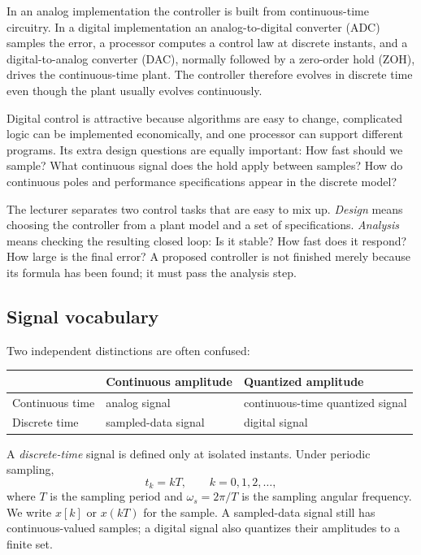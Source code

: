 \documentclass[11pt]{article}
\begin{document}
In an analog implementation the controller is built from continuous-time circuitry. In a digital implementation an analog-to-digital converter (ADC) samples the error, a processor computes a control law at discrete instants, and a digital-to-analog converter (DAC), normally followed by a zero-order hold (ZOH), drives the continuous-time plant. The controller therefore evolves in discrete time even though the plant usually evolves continuously.

Digital control is attractive because algorithms are easy to change, complicated logic can be implemented economically, and one processor can support different programs. Its extra design questions are equally important: How fast should we sample? What continuous signal does the hold apply between samples? How do continuous poles and performance specifications appear in the discrete model?

The lecturer separates two control tasks that are easy to mix up. \emph{Design} means choosing the controller from a plant model and a set of specifications. \emph{Analysis} means checking the resulting closed loop: Is it stable? How fast does it respond? How large is the final error? A proposed controller is not finished merely because its formula has been found; it must pass the analysis step.

\subsection{Signal vocabulary}

Two independent distinctions are often confused:
\begin{center}
\begin{tabular}{>{\raggedright\arraybackslash}p{}>{\raggedright\arraybackslash}p{}>{\raggedright\arraybackslash}p{}}
\toprule
 & Continuous amplitude & Quantized amplitude\\
\midrule
Continuous time & analog signal & continuous-time quantized signal\\
Discrete time & sampled-data signal & digital signal\\
\bottomrule
\end{tabular}
\end{center}

A \emph{discrete-time} signal is defined only at isolated instants. Under periodic sampling,
\[
t_k=kT,\qquad k=0,1,2,\ldots,
\]
where $T$ is the sampling period and $\omega_s=2\pi/T$ is the sampling angular frequency. We write $x[k]$ or $x(kT)$ for the sample. A sampled-data signal still has continuous-valued samples; a digital signal also quantizes their amplitudes to a finite set.
\end{document}
